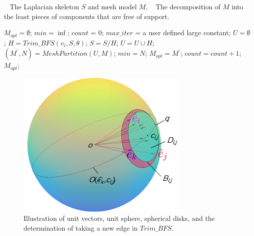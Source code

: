 \begin{algorithm}
\caption{$Skeleton\_Mesh\_Decomposition(S, M)$}
\label{alg:Framwork}
\begin{algorithmic}[1]
\REQUIRE~
The Laplacian skeleton $S$ and mesh model $M$.
\ENSURE~
The decomposition of $M$ into the least pieces of components that are free of support.

\STATE $M_{opt} = \emptyset$; $min = \inf$; $count$ = 0; $max\_iter$ = a user defined large constant;
\STATE  $U= \emptyset$;
\STATE $H = Trim\_BFS(v_i, S, \theta)$;
\STATE $S = S / H$;
\STATE $U = U \cup H$;
\ENDFOR
\STATE $(M^{'}, N) = MeshPartition(U , M)$;
\STATE  $min = N$;
\STATE  $M_{opt} = M^{'}$;
\ENDIF
\ENDWHILE
\STATE $count =count + 1$;
\ENDWHILE
\RETURN  $M_{opt}$;
\label{code:fram:select} \\
\end{algorithmic}
\end{algorithm}

\begin{figure}[tbp]
  \centering
  \includegraphics[width=0.7\linewidth]{figs/take_arc.png}
  \caption{\label{fig:sphere}%
           Illustration of unit vectors, unit sphere, spherical disks, and the determination of taking a new edge in $Trim\_BFS$.}
\end{figure}

